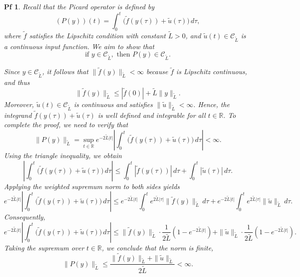 \documentclass[10pt,a4paper]{amsart}
\newtheorem{pf}{Pf}
\begin{document}
\begin{pf}
Recall that the Picard operator is defined by
\[
(P(y))(t) = \int_0^t \big(\tilde{f}(y(\tau)) + \tilde u(\tau)\big) \, d\tau,
\]
where \( \tilde{f} \) satisfies the Lipschitz condition with constant \( \tilde{L} > 0 \), and \( \tilde u(t) \in \mathcal{C}_{\tilde L} \) is a continuous input function.  
We aim to show that
\[
\text{if } y \in \mathcal{C}_{\tilde L}, \text{ then } P(y) \in \mathcal{C}_{\tilde L}.
\]

Since \( y \in \mathcal{C}_{\tilde L} \), it follows that \( \|\tilde{f}(y)\|_{\tilde L} < \infty \) because \( \tilde{f} \) is Lipschitz continuous, and thus
\[
\|\tilde{f}(y)\|_{\tilde L} \leq |\tilde{f}(0)| + \tilde{L} \|y\|_{\tilde L}.
\]
Moreover, \( \tilde u(t) \in \mathcal{C}_{\tilde L} \) is continuous and satisfies \( \|\tilde u\|_{\tilde L} < \infty \).  
Hence, the integrand \( \tilde{f}(y(\tau)) + \tilde u(\tau) \) is well defined and integrable for all \( t \in \mathbb{R} \).
To complete the proof, we need to verify that
\[
\|P(y)\|_{\tilde L} = \sup_{t \in \mathbb{R}} e^{-2\tilde L |t|} 
\left|\int_0^t \big(\tilde{f}(y(\tau)) + \tilde u(\tau)\big) \, d\tau \right| < \infty.
\]
Using the triangle inequality, we obtain
\[
\left|\int_0^t \big(\tilde{f}(y(\tau)) + \tilde u(\tau)\big) \, d\tau \right| 
\leq \int_0^t |\tilde{f}(y(\tau))| \, d\tau + \int_0^t |\tilde u(\tau)| \, d\tau.
\]
Applying the weighted supremum norm to both sides yields
\[
e^{-2\tilde{L}|t|} \left|\int_0^t \big(\tilde{f}(y(\tau)) + \tilde u(\tau)\big) \, d\tau \right| 
\leq e^{-2\tilde{L}|t|} \int_0^t e^{2\tilde{L}|\tau|} \|\tilde{f}(y)\|_{\tilde L} \, d\tau 
+ e^{-2\tilde{L}|t|} \int_0^t e^{2\tilde{L}|\tau|} \|\tilde u\|_{\tilde L} \, d\tau.
\]
Consequently,
\[
e^{-2\tilde{L}|t|} \left|\int_0^t \big(\tilde{f}(y(\tau)) + \tilde u(\tau)\big) \, d\tau \right|
\leq \|\tilde{f}(y)\|_{\tilde L} \cdot \frac{1}{2\tilde{L}} (1 - e^{-2\tilde{L}|t|}) +\|\tilde u\|_{\tilde L} \cdot \frac{1}{2\tilde{L}} (1 - e^{-2\tilde{L}|t|}).
\]
Taking the supremum over \( t \in \mathbb{R} \), we conclude that the norm is finite,
\[
\|P(y)\|_{\tilde L} \leq \frac{\|\tilde{f}(y)\|_{\tilde L} +\|\tilde u\|_{\tilde L} }{2\tilde{L}} < \infty.
\]
\end{pf} 
\end{document}
